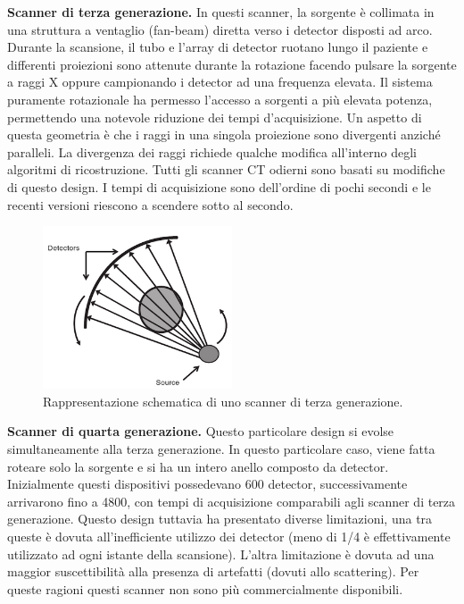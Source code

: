 \documentclass[a4paper,11pt, oneside]{article}
\begin{document}
                \bigskip
                \par
                    \textbf{Scanner di terza generazione.} In questi scanner, la sorgente è collimata in una struttura a ventaglio (fan-beam) diretta verso i detector disposti ad arco. Durante la scansione, il tubo e l’array di detector ruotano lungo il paziente e differenti proiezioni sono attenute durante la rotazione facendo pulsare la sorgente a raggi X oppure campionando i detector ad una frequenza elevata. Il sistema puramente rotazionale ha permesso l’accesso a sorgenti a più elevata potenza, permettendo una notevole riduzione dei tempi d’acquisizione. Un aspetto di questa geometria è che i raggi in una singola proiezione sono divergenti anziché paralleli. La divergenza dei raggi richiede qualche modifica all’interno degli algoritmi di ricostruzione. Tutti gli scanner CT odierni sono basati su modifiche di questo design. I tempi di acquisizione sono dell’ordine di pochi secondi e le recenti versioni riescono a scendere sotto al secondo.
                            
                    \begin{figure}[h]
                        \centering
                        \includegraphics[width=0.5\textwidth]{third-generation}
                        \caption{Rappresentazione schematica di uno scanner di terza generazione.}
                        \label{fig:third-generation}
                    \end{figure}
    
                \bigskip
                \par
                    \textbf{Scanner di quarta generazione.} Questo particolare design si evolse simultaneamente alla terza generazione. In questo particolare caso, viene fatta roteare solo la sorgente e si ha un intero anello composto da detector. Inizialmente questi dispositivi possedevano 600 detector, successivamente arrivarono fino a 4800, con tempi di acquisizione comparabili agli scanner di terza generazione. Questo design tuttavia ha presentato diverse limitazioni, una tra queste è dovuta all’inefficiente utilizzo dei detector (meno di 1/4 è effettivamente utilizzato ad ogni istante della scansione). L'altra limitazione è dovuta ad una maggior suscettibilità alla presenza di artefatti (dovuti allo scattering). Per queste ragioni questi scanner non sono più commercialmente disponibili.
                            
\end{document}
